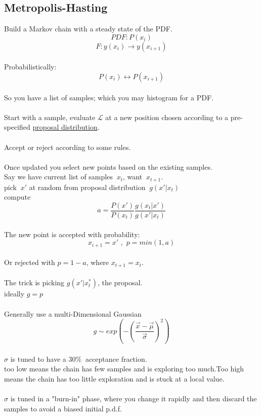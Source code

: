 \documentclass{article}
\begin{document}
\subsection{Metropolis-Hasting}
Build a Markov chain with a steady state of the PDF.\\
\[PDF: P(x_i)\]
\[F: y(x_i)\rightarrow y(x_{i+1})\]\\
Probabilistically: \[P(x_i)	\leftrightarrow P(x_{i+1})\]\\
So you have a list of samples; which you may histogram for a PDF.\\
\\
Start with a sample, evaluate $\mathcal{L}$ at a new position chosen according to a pre-specified \underline{proposal distribution}.\\
\\
Accept or reject according to some rules.\\
\\
Once updated you select new points based on the existing samples.\\
Say we have current list of samples \( \ x_t \), want \( \ x_{t+1} \).\\
pick  \( \ x' \) at random from proposal distribution  \( \ g(x'|x_t) \)\\
compute\\
\[a=\frac{P(x')}{P(x_t)}\frac{g(x_t|x')}{g(x'|x_t)}\]\\
The new point is accepted with probability:\[x_{i+1}=x'\,\, ,\,\,p=min(1,a)  \]\\
Or rejected with \( p=1-a \), where \( x_{t+1}=x_t\).\\
\\
The trick is picking \( g(x'|x_t^*) \), the proposal.\\ ideally \(g=p\)\\
\\
Generally use a multi-Dimensional Gaussian\\
\[ g \sim exp(-(\frac{\vec{x}-\vec{\mu}}{\vec{\sigma}})^2)\]\\
\(\sigma\) is tuned to have a \(30\%\ \) acceptance fraction.\\
too low means the chain has few samples and is exploring too much.Too high means the chain has too little exploration and is stuck at a local value.\\
\\
\( \sigma \) is tuned in a "burn-in" phase, where you change it rapidly and then discard the samples to avoid a biased initial p.d.f.\\
\end{document}
